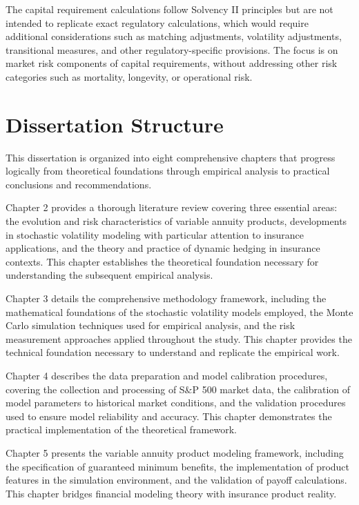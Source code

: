 \documentclass[12pt,a4paper]{report}
\begin{document}
The capital requirement calculations follow Solvency II principles but are not intended to replicate exact regulatory calculations, which would require additional considerations such as matching adjustments, volatility adjustments, transitional measures, and other regulatory-specific provisions. The focus is on market risk components of capital requirements, without addressing other risk categories such as mortality, longevity, or operational risk.

\section{Dissertation Structure}

This dissertation is organized into eight comprehensive chapters that progress logically from theoretical foundations through empirical analysis to practical conclusions and recommendations.

Chapter 2 provides a thorough literature review covering three essential areas: the evolution and risk characteristics of variable annuity products, developments in stochastic volatility modeling with particular attention to insurance applications, and the theory and practice of dynamic hedging in insurance contexts. This chapter establishes the theoretical foundation necessary for understanding the subsequent empirical analysis.

Chapter 3 details the comprehensive methodology framework, including the mathematical foundations of the stochastic volatility models employed, the Monte Carlo simulation techniques used for empirical analysis, and the risk measurement approaches applied throughout the study. This chapter provides the technical foundation necessary to understand and replicate the empirical work.

Chapter 4 describes the data preparation and model calibration procedures, covering the collection and processing of S\&P 500 market data, the calibration of model parameters to historical market conditions, and the validation procedures used to ensure model reliability and accuracy. This chapter demonstrates the practical implementation of the theoretical framework.

Chapter 5 presents the variable annuity product modeling framework, including the specification of guaranteed minimum benefits, the implementation of product features in the simulation environment, and the validation of payoff calculations. This chapter bridges financial modeling theory with insurance product reality.
\end{document}
